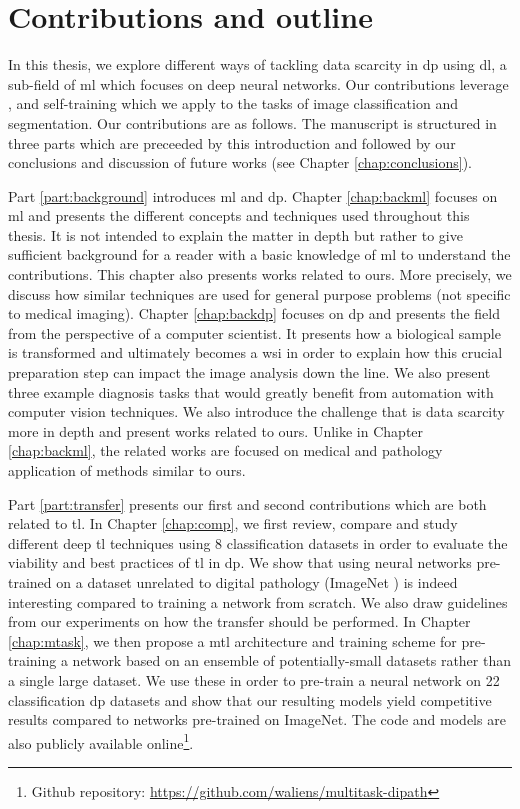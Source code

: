 \section{Contributions and outline}

In this thesis, we explore different ways of tackling data scarcity in \acrlong{dp} using \acrlong{dl}, a sub-field of \acrlong{ml} which focuses on deep neural networks. Our contributions leverage ,  and self-training which we apply to the tasks of image classification and segmentation. Our contributions are as follows. The manuscript is structured in three parts which are preceeded by this introduction and followed by our conclusions and discussion of future works (see Chapter \ref{chap:conclusions}).

Part \ref{part:background} introduces \acrlong{ml} and \acrlong{dp}. Chapter \ref{chap:backml} focuses on \acrlong{ml} and presents the different concepts and techniques used throughout this thesis. It is not intended to explain the matter in depth but rather to give sufficient background for a reader with a basic knowledge of \acrlong{ml} to understand the contributions. This chapter also presents works related to ours. More precisely, we discuss how similar techniques are used for general purpose problems (\ie not specific to medical imaging). Chapter \ref{chap:backdp} focuses on \acrlong{dp} and presents the field from the perspective of a computer scientist. It presents how a biological sample is transformed and ultimately becomes a \acrlong{wsi} in order to explain how this crucial preparation step can impact the image analysis down the line. We also present three example diagnosis tasks that would greatly benefit from automation with computer vision techniques. We also introduce the challenge that is data scarcity more in depth and present works related to ours. Unlike in Chapter \ref{chap:backml}, the related works are focused on medical and pathology application of methods similar to ours.

Part \ref{part:transfer} presents our first and second contributions which are both related to \acrlong{tl}. In Chapter \ref{chap:comp}, we first review, compare and study different deep \acrlong{tl} techniques using 8 classification datasets in order to evaluate the viability and best practices of \acrlong{tl} in \acrlong{dp}. We show that using neural networks pre-trained on a dataset unrelated to digital pathology (\ie ImageNet \parencite{deng2009imagenet}) is indeed interesting compared to training a network from scratch. We also draw guidelines from our experiments on how the transfer should be performed. In Chapter \ref{chap:mtask}, we then propose a \acrlong{mtl} architecture and training scheme for pre-training a network based on an ensemble of potentially-small datasets rather than a single large dataset. We use these in order to pre-train a neural network on 22 classification \acrlong{dp} datasets and show that our resulting models yield competitive results compared to networks pre-trained on ImageNet. The code and models are also publicly available online\footnote{Github repository: \url{https://github.com/waliens/multitask-dipath}}.

